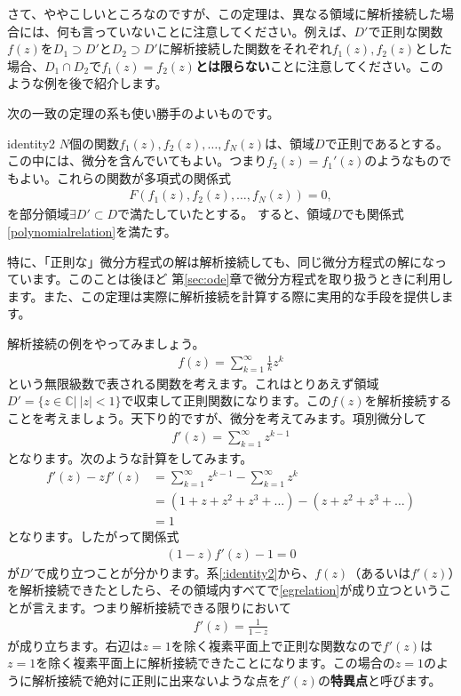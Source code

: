\documentclass[report,paper=a4, fontsize=12pt, line_length=16cm, number_of_lines=33,dvipdfmx]{jlreq}
\numberwithin{equation}{section}
\newcommand{\Cb}{\mathbb{C}}
\newcommand{\strong}[1]{\textsf{\bfseries #1}}
\begin{document}
さて、ややこしいところなのですが、この定理は、異なる領域に解析接続した場合には、何も言っていないことに注意してください。例えば、$D'$で正則な関数$f(z)$を$D_1\supset D'$と$D_2\supset D'$に解析接続した関数をそれぞれ$f_1(z), f_2(z)$とした場合、$D_1\cap D_2$で$f_1(z)=f_2(z)$\strong{とは限らない}ことに注意してください。このような例を後で紹介します。

次の一致の定理の系も使い勝手のよいものです。
\begin{col}{}{identity2}
  $N$個の関数$f_1(z),f_2(z),\dots,f_N(z)$は、領域$D$で正則であるとする。この中には、微分を含んでいてもよい。つまり$f_2(z)=f_1'(z)$のようなものでもよい。これらの関数が多項式の関係式
  \begin{align}
    F(f_1(z),f_2(z),\dots,f_N(z))=0,\label{polynomialrelation}
  \end{align}
  を部分領域$\exists D'\subset D$で満たしていたとする。
  すると、領域$D$でも関係式\eqref{polynomialrelation}を満たす。
\end{col}
特に、「正則な」微分方程式の解は解析接続しても、同じ微分方程式の解になっています。このことは後ほど
第\ref{sec:ode}章で微分方程式を取り扱うときに利用します。また、この定理は実際に解析接続を計算する際に実用的な手段を提供します。

解析接続の例をやってみましょう。
\begin{align}
  f(z)=\sum_{k=1}^{\infty}\frac{1}{k}z^k
\end{align}
という無限級数で表される関数を考えます。これはとりあえず領域$D'=\{z\in \Cb|\ |z|<1\}$で収束して正則関数になります。この$f(z)$を解析接続することを考えましょう。天下り的ですが、微分を考えてみます。項別微分して
\begin{align}
  f'(z)=\sum_{k=1}^{\infty}z^{k-1}
\end{align}
となります。次のような計算をしてみます。
\begin{align*}
  f'(z)-zf'(z)
  &=\sum_{k=1}^{\infty}z^{k-1}-\sum_{k=1}^{\infty}z^{k}\\
  &=(1+z+z^2+z^3+\dots)-(z+z^2+z^3+\dots)\\
  &=1
\end{align*}
となります。したがって関係式
\begin{align}
  (1-z)f'(z)-1=0\label{egrelation}
\end{align}
が$D'$で成り立つことが分かります。系\ref{:identity2}から、$f(z)$（あるいは$f'(z)$）を解析接続できたとしたら、その領域内すべてで\eqref{egrelation}が成り立つということが言えます。つまり解析接続できる限りにおいて
\begin{align}
  f'(z)=\frac{1}{1-z}
\end{align}
が成り立ちます。右辺は$z=1$を除く複素平面上で正則な関数なので$f'(z)$は$z=1$を除く複素平面上に解析接続できたことになります。この場合の$z=1$のように解析接続で絶対に正則に出来ないような点を$f'(z)$の\strong{特異点}と呼びます。
\end{document}
